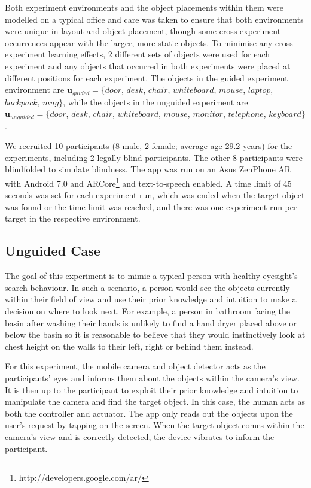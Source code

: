 \documentclass[runningheads]{llncs}
\begin{document}
Both experiment environments and the object placements within them were modelled on a typical office and care was taken to ensure that both environments were unique in layout and object placement, though some cross-experiment occurrences appear with the larger, more static objects. 
To minimise any cross-experiment learning effects, 2 different sets of objects were used for each experiment and any objects that occurred in both experiments were placed at different positions for each experiment. 
The objects in the guided experiment environment are $\mathbf{u}_{guided} = \{ door$, $desk$, $chair$, $whiteboard$, $mouse$, $laptop$, $backpack$, $mug \}$, while the objects in the unguided experiment are $\mathbf{u}_{unguided} = \{ door$, $desk$, $chair$, $whiteboard$, $mouse$, $monitor$, $telephone$, $keyboard \}$.

We recruited 10 participants (8 male, 2 female; average age 29.2 years) for the experiments, including 2 legally blind participants. 
The other 8 participants were blindfolded to simulate blindness. 
The app was run on an Asus ZenPhone AR with Android 7.0 and ARCore\footnote{http://developers.google.com/ar/} and text-to-speech enabled. 
A time limit of 45 seconds was set for each experiment run, which was ended when the target object was found or the time limit was reached, and there was one experiment run per target in the respective environment.

\subsection{Unguided Case}

The goal of this experiment is to mimic a typical person with healthy eyesight's search behaviour. 
In such a scenario, a person would see the objects currently within their field of view and use their prior knowledge and intuition to make a decision on where to look next.
For example, a person in bathroom facing the basin after washing their hands is unlikely to find a hand dryer placed above or below the basin so it is reasonable to believe that they would instinctively look at chest height on the walls to their left, right or behind them instead. 

For this experiment, the mobile camera and object detector acts as the participants' eyes and informs them about the objects within the camera's view.
It is then up to the participant to exploit their prior knowledge and intuition to manipulate the camera and find the target object. 
In this case, the human acts as both the controller and actuator. 
The app only reads out the objects upon the user's request by tapping on the screen. 
When the target object comes within the camera's view and is correctly detected, the device vibrates to inform the participant. 
\end{document}

